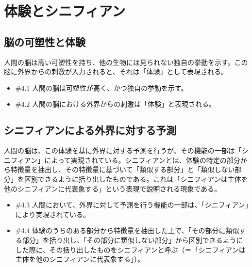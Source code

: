 \section{体験とシニフィアン}\label{ux4f53ux9a13ux3068ux30b7ux30cbux30d5ux30a3ux30a2ux30f3}

\subsection{脳の可塑性と体験}\label{ux8133ux306eux53efux5851ux6027ux3068ux4f53ux9a13}

人間の脳は高い可塑性を持ち、他の生物には見られない独自の挙動を示す。この脳に外界からの刺激が入力されると、それは「体験」として表現される。

\begin{note}{}
  \begin{itemize}
    \tightlist
    \item{\#4.1}
      人間の脳は可塑性が高く、かつ独自の挙動を示す。
    \item{\#4.2}
      人間の脳における外界からの刺激は「体験」と表現される。
  \end{itemize}
\end{note}

\subsection{シニフィアンによる外界に対する予測}\label{ux30b7ux30cbux30d5ux30a3ux30a2ux30f3ux306bux3088ux308bux5916ux754cux306bux5bfeux3059ux308bux4e88ux6e2c}

人間の脳は、この体験を基に外界に対する予測を行うが、その機能の一部は「シニフィアン」によって実現されている。シニフィアンとは、体験の特定の部分から特徴量を抽出し、その特徴量に基づいて「類似する部分」と「類似しない部分」を区別できるように括り出したものである。これは「シニフィアンは主体を他のシニフィアンに代表象する」という表現で説明される現象である。

\begin{note}{}
  \begin{itemize}
    \tightlist
    \item{\#4.3}
      人間において、外界に対して予測を行う機能の一部は、「シニフィアン」により実現されている。
    \item{\#4.4}
      体験のうちのある部分から特徴量を抽出した上で、「その部分に類似する部分」を括り出し、「その部分に類似しない部分」から区別できるようにした際に、その括り出したものをシニフィアンと呼ぶ（＝「シニフィアンは主体を他のシニフィアンに代表象する」）。
  \end{itemize}
\end{note}


